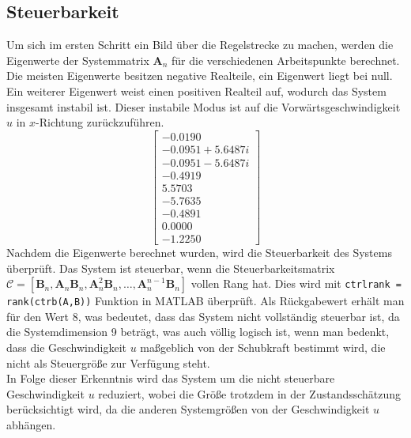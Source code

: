 \subsection{Steuerbarkeit}
\label{subsec:steuerbarkeit}
Um sich im ersten Schritt ein Bild über die Regelstrecke zu machen, werden die Eigenwerte der Systemmatrix $\mathbf{A}_n$ für die verschiedenen Arbeitspunkte berechnet. Die meisten Eigenwerte besitzen negative Realteile, ein Eigenwert liegt bei null. Ein weiterer Eigenwert weist einen positiven Realteil auf, wodurch das System insgesamt instabil ist. Dieser instabile Modus ist auf die Vorwärtsgeschwindigkeit $u$ in $x$-Richtung zurückzuführen.
\begin{equation}
\begin{bmatrix}
-0.0190 \\
-0.0951 + 5.6487i \\
-0.0951 - 5.6487i \\
-0.4919 \\
5.5703 \\
-5.7635 \\
-0.4891 \\
0.0000 \\
-1.2250
\end{bmatrix}
\end{equation}
Nachdem die Eigenwerte berechnet wurden, wird die Steuerbarkeit des Systems überprüft. Das System ist steuerbar, wenn die Steuerbarkeitsmatrix $\mathcal{C} = [\mathbf{B}_n, \mathbf{A}_n \mathbf{B}_n, \mathbf{A}_n^2 \mathbf{B}_n, \ldots, \mathbf{A}_n^{n-1} \mathbf{B}_n]$ vollen Rang hat. Dies wird mit \texttt{ctrlrank = rank(ctrb(A,B))} Funktion in MATLAB überprüft. Als Rückgabewert erhält man für den Wert 8, was bedeutet, dass das System nicht vollständig steuerbar ist, da die Systemdimension 9 beträgt, was auch völlig logisch ist, wenn man bedenkt, dass die Geschwindigkeit $u$ maßgeblich von der Schubkraft bestimmt wird, die nicht als Steuergröße zur Verfügung steht.
\\
In Folge dieser Erkenntnis wird das System um die nicht steuerbare Geschwindigkeit $u$ reduziert, wobei die Größe trotzdem in der Zustandsschätzung berücksichtigt wird, da die anderen Systemgrößen von der Geschwindigkeit $u$ abhängen. 

